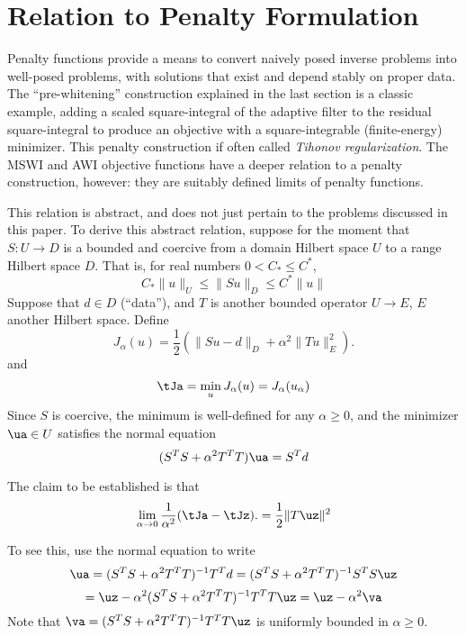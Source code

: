 \section{Relation to Penalty Formulation}
Penalty functions provide a means to convert naively posed
inverse problems into well-posed problems, with solutions that exist
and depend stably on proper data. The ``pre-whitening'' construction
explained in the last section is a classic example, adding a scaled
square-integral of the adaptive filter to the residual square-integral to
produce an objective with a square-integrable (finite-energy)
minimizer. This penalty construction if often called {\em Tihonov
  regularization}. The MSWI and AWI objective functions have a deeper
relation to a penalty construction, however: they are
suitably defined limits of penalty functions.

This relation is abstract, and does not just pertain to the problems
discussed in this paper. To derive this abstract relation, suppose for
the moment that $S:U \rightarrow D$ is a bounded and coercive from a
domain Hilbert space $U$ to a range Hilbert space $D$. That is, for
real numbers $0 < C_* \le C^*$,
\[
  C_*\|u\|_U \le \|Su\|_D \le C^*\|u\|
\]
Suppose that $d \in D$ (``data''), and $T$ is another bounded operator $U \rightarrow E$, $E$
another Hilbert space. Define
\begin{equation}
  \label{eqn:eq1}
  J_{\alpha}(u) = \frac{1}{2}(\|Su-d\|_D + \alpha^2\|Tu\|_E^2).
\end{equation}
and
\begin{equation}
  \label{eqn:eq0}
  \tJa= \min_u J_{\alpha}(u) = J_{\alpha}(u_{\alpha})
\end{equation}
Since $S$ is coercive, the minimum is well-defined for any
$\alpha \ge 0$, and the minimizer $\ua \in U$ satisfies the normal
equation
\begin{equation}
  \label{eqn:eq0n}
  (S^TS + \alpha^2 T^TT) \ua = S^Td
\end{equation}

The claim to be established is that
\begin{equation}
  \label{eqn:eq4}
  \lim_{\alpha \rightarrow 0} \frac{1}{\alpha^2}  (\tJa-\tJz).= \frac{1}{2}\|T\uz\|^2
\end{equation}

To see this, use the normal equation to write
\[
  \ua = (S^TS + \alpha^2 T^TT)^{-1}T^Td = (S^TS + \alpha^2 T^TT)^{-1}S^TS \uz
\]
\begin{equation}
  \label{eqn:eq2}
  = \uz - \alpha^2 (S^TS + \alpha^2 T^TT)^{-1}T^TT\uz = \uz-\alpha^2 \va
\end{equation}
Note that $\va = (S^TS + \alpha^2 T^TT)^{-1}T^TT\uz$ is uniformly bounded in $\alpha \ge 0$.


